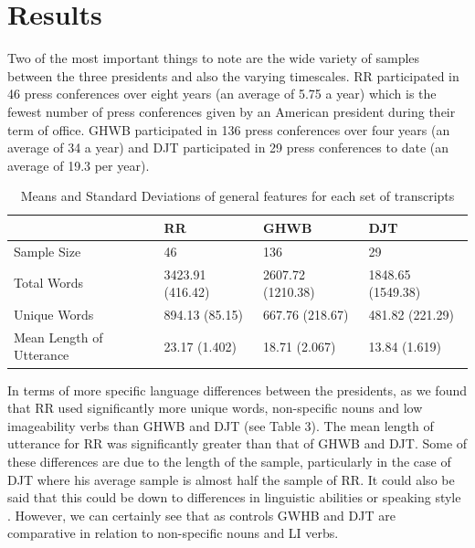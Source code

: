 \documentclass[12pt]{article}
\begin{document}
\section{Results}\label{results}
Two of the most important things to note are the wide variety of samples between the three presidents and also the varying timescales. RR participated in 46 press conferences over eight years (an average of 5.75 a year) which is the fewest number of press conferences given by an American president during their term of office. GHWB participated in 136 press conferences over four years (an average of 34 a year) and DJT participated in 29 press conferences to date (an average of 19.3 per year). 

\begin{table}[H]
	\begin{center}
	\begin{tabular}{ | p{3cm} | p{1.5cm} | p{1.5cm} | p{1.5cm} |}
		\hline
		& RR & GHWB & DJT \\ \hline
		Sample Size & 46 & 136 & 29 \\ \hline
		Total Words & 3423.91 (416.42) & 2607.72 (1210.38) & 1848.65 (1549.38) \\ \hline
		Unique Words & 894.13 (85.15) & 667.76 (218.67) & 481.82 (221.29) \\ \hline
		Mean Length of Utterance & 23.17 (1.402) & 18.71 (2.067) & 13.84 (1.619) \\ \hline
	\end{tabular}
	\caption{\label{tab:table-name}Means and Standard Deviations of general features for each set of transcripts}
	\end{center} 
\end{table}

In terms of more specific language differences between the presidents, as we found that RR used significantly more unique words, non-specific nouns and low imageability verbs than GHWB and DJT (see Table 3). The mean length of utterance for RR was significantly greater than that of GHWB and DJT. Some of these differences are due to the length of the sample, particularly in the case of DJT where his average sample is almost half the sample of RR. It could also be said that this could be down to differences in linguistic abilities or speaking style \cite{Berisha2015, Le2011}. However, we can certainly see that as controls GWHB and DJT are comparative in relation to non-specific nouns and LI verbs. 
\end{document}
